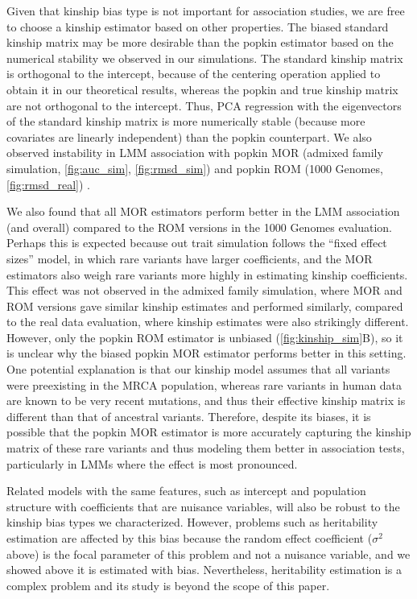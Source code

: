 \documentclass[11pt]{article}
\begin{document}
Given that kinship bias type is not important for association studies, we are free to choose a kinship estimator based on other properties.
The biased standard kinship matrix may be more desirable than the popkin estimator based on the numerical stability we observed in our simulations.
The standard kinship matrix is orthogonal to the intercept, because of the centering operation applied to obtain it in our theoretical results, whereas the popkin and true kinship matrix are not orthogonal to the intercept.
Thus, PCA regression with the eigenvectors of the standard kinship matrix is more numerically stable (because more covariates are linearly independent) than the popkin counterpart.
We also observed instability in LMM association with popkin MOR (admixed family simulation, \cref{fig:auc_sim}, \cref{fig:rmsd_sim}) and popkin ROM (1000 Genomes, \cref{fig:rmsd_real}) .

We also found that all MOR estimators perform better in the LMM association (and overall) compared to the ROM versions in the 1000 Genomes evaluation.
Perhaps this is expected because out trait simulation follows the ``fixed effect sizes'' model, in which rare variants have larger coefficients, and the MOR estimators also weigh rare variants more highly in estimating kinship coefficients.
This effect was not observed in the admixed family simulation, where MOR and ROM versions gave similar kinship estimates and performed similarly, compared to the real data evaluation, where kinship estimates were also strikingly different.
However, only the popkin ROM estimator is unbiased (\cref{fig:kinship_sim}B), so it is unclear why the biased popkin MOR estimator performs better in this setting.
One potential explanation is that our kinship model assumes that all variants were preexisting in the MRCA population, whereas rare variants in human data are known to be very recent mutations, and thus their effective kinship matrix is different than that of ancestral variants.
Therefore, despite its biases, it is possible that the popkin MOR estimator is more accurately capturing the kinship matrix of these rare variants and thus modeling them better in association tests, particularly in LMMs where the effect is most pronounced.

Related models with the same features, such as intercept and population structure with coefficients that are nuisance variables, will also be robust to the kinship bias types we characterized.
However, problems such as heritability estimation are affected by this bias because the random effect coefficient ($\sigma^2$ above) is the focal parameter of this problem and not a nuisance variable, and we showed above it is estimated with bias.
Nevertheless, heritability estimation is a complex problem and its study is beyond the scope of this paper.
\end{document}
